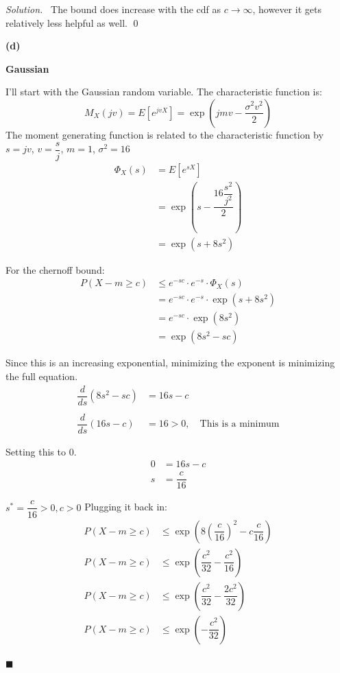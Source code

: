 \documentclass[11pt]{article}
\newenvironment{solution}
{\par\medskip\noindent\textit{Solution.}\ }
{\hfill$\blacksquare$\par\medskip}
\begin{document}
\begin{solution}
        The bound does increase with the cdf as $c \to \infty$, however it gets relatively less helpful as well.
        \qed

        \vspace{1em}
        \textbf{(d)}

        \textbf{Gaussian}

        I'll start with the Gaussian random variable.
        The characteristic function is:
        \[
            M_X(jv) = E[e^{jvX}] = \exp{\left(jmv - \dfrac{\sigma^2 v^2}{2} \right)}
        \]
        The moment generating function is related to the characteristic function by $s = jv$, $v = \dfrac{s}{j}$, $m = 1$, $\sigma^2 = 16$
        \begin{align*}
            \Phi_X(s) &= E[e^{sX}] \\
            &= \exp{\left(s - \dfrac{16 \dfrac{s^2}{j^2}}{2} \right)} \\
            &= \exp{\left(s + 8 s^2 \right)}
        \end{align*}

        For the chernoff bound:
        \begin{align*}
            P(X - m \geq c) &\leq e^{-sc} \cdot e^{-s} \cdot \Phi_X(s) \\
            &= e^{-sc} \cdot e^{-s} \cdot \exp{\left(s + 8 s^2 \right)} \\
            &= e^{-sc} \cdot \exp{\left(8 s^2 \right)} \\
            &= \exp{\left(8 s^2 -sc \right)}
        \end{align*}

        Since this is an increasing exponential, minimizing the exponent is minimizing the full equation.
        \begin{align*}
            \dfrac{d}{ds} (8 s^2 -sc) &= 16s - c \\
            \\
            \dfrac{d}{ds} (16s - c) &= 16 > 0, \quad \text{This is a minimum}
        \end{align*}

        Setting this to $0$.
        \begin{align*}
            0 &= 16s - c \\
            s &= \dfrac{c}{16}
        \end{align*}

        $s^* = \dfrac{c}{16} > 0, c > 0$
        Plugging it back in:
        \begin{align*}
            P(X - m \geq c) &\leq \exp{\left(8 (\dfrac{c}{16})^2 - c \dfrac{c}{16} \right)} \\
            P(X - m \geq c) &\leq \exp{\left(\dfrac{c^2}{32} - \dfrac{c^2}{16} \right)} \\
            P(X - m \geq c) &\leq \exp{\left(\dfrac{c^2}{32} - \dfrac{2c^2}{32} \right)} \\
            P(X - m \geq c) &\leq \exp{\left(-\dfrac{c^2}{32} \right)}
        \end{align*}


\end{solution}
\end{document}
